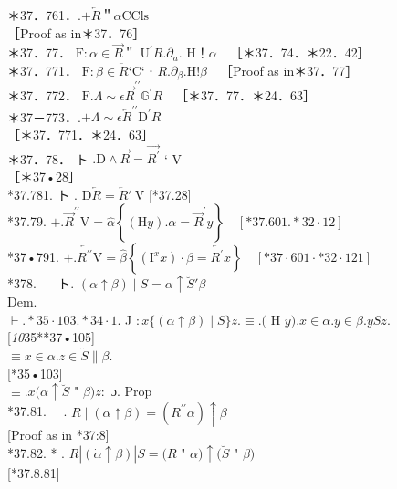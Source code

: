 \documentclass[10pt]{article}
\begin{document}
＊37．761．.$+ \overleftarrow{R}$＂$\alpha \mathrm{C} \mathrm{Cls}$\\
［Proof as in＊37．76］\\
＊37．77． $\mathrm{F}: \alpha \in \vec{R}$＂ $\mathrm{U}^{\prime} R . \partial_{a}$. H！$\alpha \quad$［＊37．74．＊22．42］\\
＊37．771． $\mathrm{F}: \beta \in \overleftarrow{R} ‘ \mathrm{C} ‘$ ⋅ $R . \partial_{\beta} . \mathrm{H}!\beta \quad$［Proof as in＊37．77］\\
＊37．772． $\mathrm{F} . \Lambda \sim \epsilon \vec{R}^{\prime \prime} \mathbb{G}^{\prime} R \quad$［＊37．77．＊24．63］\\
＊37－773．.$+ \Lambda \sim \epsilon \overleftarrow{R}^{\prime \prime} \mathrm{D}^{\prime} R$\\
［＊37．771．＊24．63］\\
＊37．78． ト $. \mathrm{D} \wedge \vec{R}=\overrightarrow{R^{\prime}}$ ‘ V\\
［＊37•28］\\
*37.781. ト . $\mathrm{D} \overleftarrow{R}=\overleftarrow{R} \prime \mathrm{~V}$ [*37.28]\\
*37.79. $+. \vec{R}^{\prime \prime} \mathrm{V}=\hat{\alpha}\left\{(\mathrm{H} y) . \alpha=\vec{R}^{\prime} y\right\} \quad[* 37.601 . * 32 \cdot 12]$\\
*37•791. $+. \overleftarrow{R^{\prime \prime}} \mathrm{V}=\hat{\beta}\left\{\left(\mathrm{I}^{x} x\right) \cdot \beta=\overleftarrow{R^{\prime}} x\right\} \quad[* 37 \cdot 601 \cdot * 32 \cdot 121]$\\
*378. $\quad$ ト. $(\alpha \uparrow \beta) \mid S=\alpha \uparrow \breve{S} \prime \beta$\\
Dem.\\
$\vdash . * 35 \cdot 103 . * 34 \cdot 1$. J $: x\{(\alpha \uparrow \beta) \mid S\} z . \equiv .($ H $y) . x \in \alpha . y \in \beta . y S z$.\\[0pt]
[\textit{10}35**37•105]\\
$\equiv x \in \alpha . z \in \breve{S} \| \beta$.\\[0pt]
[*35•103]\\
$\equiv . x(\alpha \uparrow \breve{S}$ " $\beta) z:$ ɔ. Prop\\
*37.81. $\quad$. $R \mid(\alpha \uparrow \beta)=\left(R^{\prime \prime} \alpha\right) \uparrow \beta$\\[0pt]
[Proof as in *37:8]\\
*37.82. * . $R|(\dot{\alpha} \uparrow \beta)| S=(R$ " $\alpha) \uparrow(\breve{S}$ " $\beta)$\\[0pt]
[*37.8.81]
\end{document}
